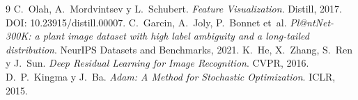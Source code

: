 \documentclass[11pt,a4paper]{article}
\begin{document}
\begin{thebibliography}{9}\small
{} C.~Olah, A.~Mordvintsev y L.~Schubert.
\emph{Feature Visualization}. Distill, 2017. DOI: 10.23915/distill.00007.
 C.~Garcin, A.~Joly, P.~Bonnet et~al.
\emph{Pl@ntNet-300K: a plant image dataset with high label ambiguity and a
long-tailed distribution}. NeurIPS Datasets and Benchmarks, 2021.
 K.~He, X.~Zhang, S.~Ren y J.~Sun. \emph{Deep Residual
Learning for Image Recognition}. CVPR, 2016.
 D.~P.~Kingma y J.~Ba. \emph{Adam: A Method for Stochastic
Optimization}. ICLR, 2015.
\end{thebibliography}
\end{document}
